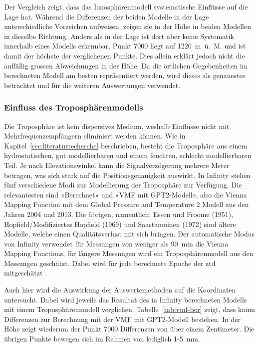 Der Vergleich zeigt, dass das Ionosphärenmodell systematische Einflüsse auf die Lage hat. Während die Differenzen der 
beiden Modelle in der Lage unterschiedliche Vorzeichen aufweisen, zeigen sie in der Höhe in beiden Modellen 
in dieselbe Richtung. Anders als in der Lage ist dort aber keine Systematik innerhalb eines Modells erkennbar. 
Punkt 7000 liegt auf 1220~m~ü.~M. und ist damit der höchste der verglichenen Punkte. Dies allein erklärt jedoch nicht die 
auffällig grossen Abweichungen in der Höhe.
Da die örtlichen Gegebenheiten im berechneten Modell am besten repräsentiert werden,
wird dieses als genauestes betrachtet und für die weiteren Auswertungen verwendet.

\subsubsection{Einfluss des Troposphärenmodells}
\label{sec:troposphäre}
Die Troposphäre ist kein dispersives Medium, weshalb Einflüsse nicht mit Mehrfrequenzempfängern eliminiert werden können.
Wie in Kapitel~\ref{sec:literaturrecherche} beschrieben, besteht die Troposphäre aus einem hydrostatischen, gut modellierbaren und einem
feuchten, schlecht modellierbaren Teil. Je nach Elevationswinkel kann die Signalverzögerung mehrere Meter betragen,
was sich stark auf die Positionsgenauigkeit auswirkt. In Infinity stehen fünf verschiedene Modi zur Modellierung der Troposphäre zur Verfügung.
Die relevantesten sind «Berechnet» und «VMF mit GPT2-Modell», also die Vienna Mapping Function \parencite{boehmViennaMappingFunctions2004} mit dem
Global Pressure and Temperature 2 Modell \parencite{laglerGPT2EmpiricalSlant2013} aus den Jahren 2004 und 2013. Die übrigen, namentlich: Essen und Froome (1951),
Hopfield/Modifiziertes Hopfield (1969) und Saastamoinen (1972) sind ältere Modelle, welche einen Qualitätsverlust mit sich bringen.
Der automatische Modus von Infinity verwendet für Messungen von weniger als 90~min die Vienna Mapping Functions,
für längere Messungen wird ein Troposphärenmodell aus den Messungen geschätzt. Dabei wird für jede berechnete Epoche 
der \gls{ztd} mitgeschätzt \parencite{leica-geosystemsLeicaInfinity2026}.

Auch hier wird die Auswirkung der Auswertemethoden auf die Koordinaten untersucht.
Dabei wird jeweils das Resultat des in Infinity berechneten Modells mit einem Troposphärenmodell verglichen. 
Tabelle~\ref{tab:vmf-ber} zeigt, dass kaum Differenzen zur Berechnung mit der VMF mit GPT2-Modell bestehen. In der Höhe zeigt 
wiederum der Punkt 7000 Differenzen von über einem Zentimeter. Die übrigen Punkte bewegen sich im Rahmen von lediglich 1-5~mm.

